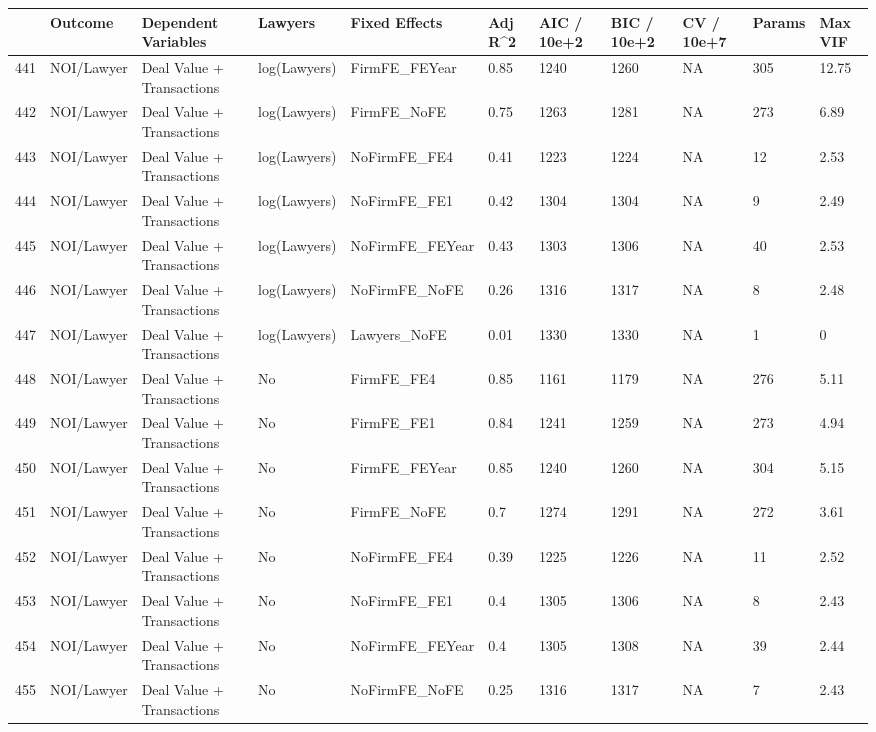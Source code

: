 \documentclass{article}
\begin{document}
\begin{table}[H]
\centering
\begin{tabular}{rllllllllll}
  \hline
 & Outcome & Dependent Variables & Lawyers & Fixed Effects & Adj R^2 & AIC / 10e+2 & BIC / 10e+2 & CV / 10e+7 & Params & Max VIF \\ 
  \hline
441 & NOI/Lawyer & Deal Value + Transactions & log(Lawyers) & FirmFE\_FEYear & 0.85 & 1240 & 1260 & NA & 305 & 12.75 \\ 
  442 & NOI/Lawyer & Deal Value + Transactions & log(Lawyers) & FirmFE\_NoFE & 0.75 & 1263 & 1281 & NA & 273 & 6.89 \\ 
  443 & NOI/Lawyer & Deal Value + Transactions & log(Lawyers) & NoFirmFE\_FE4 & 0.41 & 1223 & 1224 & NA & 12 & 2.53 \\ 
  444 & NOI/Lawyer & Deal Value + Transactions & log(Lawyers) & NoFirmFE\_FE1 & 0.42 & 1304 & 1304 & NA & 9 & 2.49 \\ 
  445 & NOI/Lawyer & Deal Value + Transactions & log(Lawyers) & NoFirmFE\_FEYear & 0.43 & 1303 & 1306 & NA & 40 & 2.53 \\ 
  446 & NOI/Lawyer & Deal Value + Transactions & log(Lawyers) & NoFirmFE\_NoFE & 0.26 & 1316 & 1317 & NA & 8 & 2.48 \\ 
  447 & NOI/Lawyer & Deal Value + Transactions & log(Lawyers) & Lawyers\_NoFE & 0.01 & 1330 & 1330 & NA & 1 & 0 \\ 
  448 & NOI/Lawyer & Deal Value + Transactions & No & FirmFE\_FE4 & 0.85 & 1161 & 1179 & NA & 276 & 5.11 \\ 
  449 & NOI/Lawyer & Deal Value + Transactions & No & FirmFE\_FE1 & 0.84 & 1241 & 1259 & NA & 273 & 4.94 \\ 
  450 & NOI/Lawyer & Deal Value + Transactions & No & FirmFE\_FEYear & 0.85 & 1240 & 1260 & NA & 304 & 5.15 \\ 
  451 & NOI/Lawyer & Deal Value + Transactions & No & FirmFE\_NoFE & 0.7 & 1274 & 1291 & NA & 272 & 3.61 \\ 
  452 & NOI/Lawyer & Deal Value + Transactions & No & NoFirmFE\_FE4 & 0.39 & 1225 & 1226 & NA & 11 & 2.52 \\ 
  453 & NOI/Lawyer & Deal Value + Transactions & No & NoFirmFE\_FE1 & 0.4 & 1305 & 1306 & NA & 8 & 2.43 \\ 
  454 & NOI/Lawyer & Deal Value + Transactions & No & NoFirmFE\_FEYear & 0.4 & 1305 & 1308 & NA & 39 & 2.44 \\ 
  455 & NOI/Lawyer & Deal Value + Transactions & No & NoFirmFE\_NoFE & 0.25 & 1316 & 1317 & NA & 7 & 2.43 \\ 

\end{tabular}
\end{table}
\end{document}
